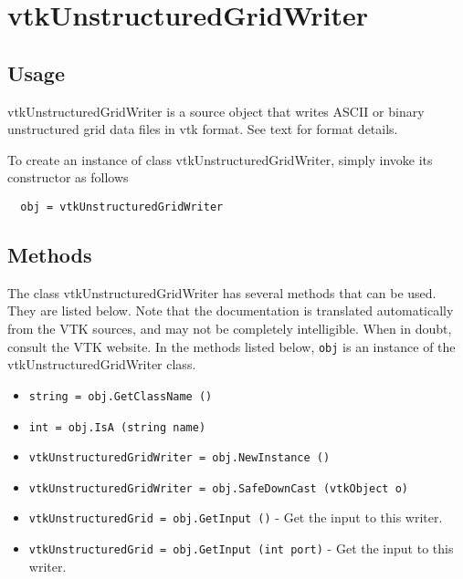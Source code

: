 \section{vtkUnstructuredGridWriter}

\subsection{Usage}

 vtkUnstructuredGridWriter is a source object that writes ASCII or binary 
 unstructured grid data files in vtk format. See text for format details.

To create an instance of class vtkUnstructuredGridWriter, simply
invoke its constructor as follows
\begin{verbatim}
  obj = vtkUnstructuredGridWriter
\end{verbatim}
\subsection{Methods}

The class vtkUnstructuredGridWriter has several methods that can be used.
  They are listed below.
Note that the documentation is translated automatically from the VTK sources,
and may not be completely intelligible.  When in doubt, consult the VTK website.
In the methods listed below, \verb|obj| is an instance of the vtkUnstructuredGridWriter class.
\begin{itemize}
\item  \verb|string = obj.GetClassName ()|

\item  \verb|int = obj.IsA (string name)|

\item  \verb|vtkUnstructuredGridWriter = obj.NewInstance ()|

\item  \verb|vtkUnstructuredGridWriter = obj.SafeDownCast (vtkObject o)|

\item  \verb|vtkUnstructuredGrid = obj.GetInput ()| -  Get the input to this writer.

\item  \verb|vtkUnstructuredGrid = obj.GetInput (int port)| -  Get the input to this writer.

\end{itemize}
